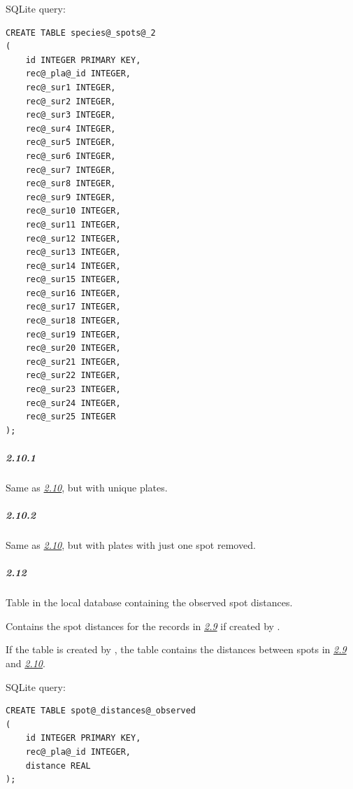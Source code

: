 \documentclass[letterpaper,10pt,english]{sphinxmanual}
\begin{document}
SQLite query:

\begin{Verbatim}[commandchars=@\[\]]
CREATE TABLE species@_spots@_2
(
    id INTEGER PRIMARY KEY,
    rec@_pla@_id INTEGER,
    rec@_sur1 INTEGER,
    rec@_sur2 INTEGER,
    rec@_sur3 INTEGER,
    rec@_sur4 INTEGER,
    rec@_sur5 INTEGER,
    rec@_sur6 INTEGER,
    rec@_sur7 INTEGER,
    rec@_sur8 INTEGER,
    rec@_sur9 INTEGER,
    rec@_sur10 INTEGER,
    rec@_sur11 INTEGER,
    rec@_sur12 INTEGER,
    rec@_sur13 INTEGER,
    rec@_sur14 INTEGER,
    rec@_sur15 INTEGER,
    rec@_sur16 INTEGER,
    rec@_sur17 INTEGER,
    rec@_sur18 INTEGER,
    rec@_sur19 INTEGER,
    rec@_sur20 INTEGER,
    rec@_sur21 INTEGER,
    rec@_sur22 INTEGER,
    rec@_sur23 INTEGER,
    rec@_sur24 INTEGER,
    rec@_sur25 INTEGER
);
\end{Verbatim}


\subparagraph{2.10.1}
\label{design_parts_data:design-part-data-2-10-1}\label{design_parts_data:id17}
Same as {\hyperref[design_parts_data:design-part-data-2-10]{\emph{2.10}}}, but with unique plates.


\subparagraph{2.10.2}
\label{design_parts_data:design-part-data-2-10-2}\label{design_parts_data:id18}
Same as {\hyperref[design_parts_data:design-part-data-2-10]{\emph{2.10}}}, but with plates with just one
spot removed.


\subparagraph{2.12}
\label{design_parts_data:design-part-data-2-12}\label{design_parts_data:id19}
Table  in the local database containing the
observed spot distances.

Contains the spot distances for the records in {\hyperref[design_parts_data:design-part-data-2-9]{\emph{2.9}}}
if created by {\hyperref[setlyze/analysis/attraction_intra:setlyze.analysis.attraction_intra.Start.calculate_distances_intra]{}}.

If the table is created by {\hyperref[setlyze/analysis/attraction_inter:setlyze.analysis.attraction_inter.Start.calculate_distances_inter]{}},
the table contains the distances between spots in {\hyperref[design_parts_data:design-part-data-2-9]{\emph{2.9}}}
and {\hyperref[design_parts_data:design-part-data-2-10]{\emph{2.10}}}.

SQLite query:

\begin{Verbatim}[commandchars=@\[\]]
CREATE TABLE spot@_distances@_observed
(
    id INTEGER PRIMARY KEY,
    rec@_pla@_id INTEGER,
    distance REAL
);
\end{Verbatim}
\end{document}
